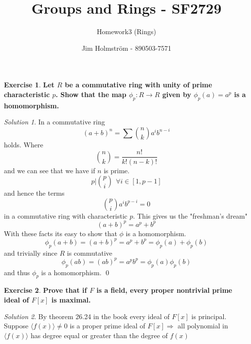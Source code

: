 \documentclass[a4paper,twoside=false,abstract=false,numbers=noenddot,
titlepage=false,headings=small,parskip=half,version=last]{scrartcl}
\author{Jim Holmström - 890503-7571}
\title{Groups and Rings - SF2729}
\subtitle{Homework3 (Rings)}
\theoremstyle{definition}
\newtheorem{exercise}{Exercise}
\theoremstyle{remark}
\newtheorem*{solution}{Solution}
\begin{document}
\maketitle
\thispagestyle{empty}

\begin{exercise}
{\bf
Let $R$ be a commutative ring with unity of prime characteristic $p$. Show that
the map $\phi_p:R\rightarrow R$ given by $\phi_p(a)=a^p$ is a homomorphism.
}
\end{exercise}
\begin{solution}
In a commutative ring 
\begin{equation}
    (a+b)^n=\sum \binom{n}{k} a^ib^{n-i}
\end{equation}
holds. Where
\begin{equation}
    \binom{n}{k} = \frac{n!}{k!(n-k)!}
\end{equation}
and we can see that we have if $n$ is prime.
\begin{equation}
    p|\binom{p}{i} ~~ \forall i \in \left[1,p-1\right]
\end{equation}
and hence the terms
\begin{equation}
    \binom{p}{i}a^ib^{p-i}=0
\end{equation}
in a commutative ring with characteristic $p$. This gives us the "freshman's dream"
\begin{equation}
    (a+b)^p=a^p+b^p
\end{equation}
With these facts its easy to show that $\phi$ is a homomorphism.
\begin{equation}
    \phi_p(a+b)=(a+b)^p=a^p+b^p=\phi_p(a)+\phi_p(b)
\end{equation}
and trivially since $R$ is commutative
\begin{equation}
    \phi_p(ab)=(ab)^p=a^pb^p=\phi_p(a)\phi_p(b)
\end{equation}
and thus $\phi_p$ is a homomorphism. \qed

\end{solution}

\begin{exercise}
{\bf
Prove that if $F$ is a field, every proper nontrivial prime ideal of
$F\left[x\right]$ is maximal.
}
\end{exercise}
\begin{solution}
By theorem 26.24 in the book every ideal of $F\left[x\right]$ is principal.
Suppose $\langle f(x) \rangle \neq {0}$ is a proper prime ideal of
$F\left[x\right] \Rightarrow$ all polynomial in $\langle f(x) \rangle$ has
degree equal or greater than the degree of $f(x)$
\end{solution}

\end{document}

